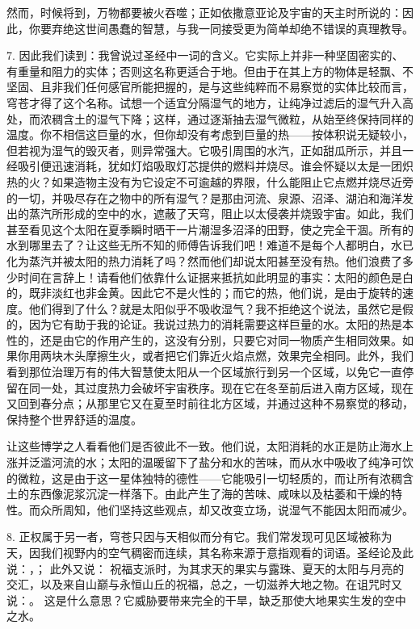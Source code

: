 然而，时候将到，万物都要被火吞噬；正如依撒意亚论及宇宙的天主时所说的：因此，你要弃绝这世间愚蠢的智慧，与我一同接受更为简单却绝不错误的真理教导。\par

7. 因此我们读到：我曾说过圣经中一词的含义。它实际上并非一种坚固密实的、有重量和阻力的实体；否则这名称更适合于地。但由于在其上方的物体是轻飘、不坚固、且非我们任何感官所能把握的，是与这些纯粹而不易察觉的实体比较而言，穹苍才得了这个名称。试想一个适宜分隔湿气的地方，让纯净过滤后的湿气升入高处，而浓稠含土的湿气下降；这样，通过逐渐抽去湿气微粒，从始至终保持同样的温度。你不相信这巨量的水，但你却没有考虑到巨量的热——按体积说无疑较小，但若视为湿气的毁灭者，则异常强大。它吸引周围的水汽，正如甜瓜所示，并且一经吸引便迅速消耗，犹如灯焰吸取灯芯提供的燃料并烧尽。谁会怀疑以太是一团炽热的火？如果造物主没有为它设定不可逾越的界限，什么能阻止它点燃并烧尽近旁的一切，并吸尽存在之物中的所有湿气？是那由河流、泉源、沼泽、湖泊和海洋发出的蒸汽所形成的空中的水，遮蔽了天穹，阻止以太侵袭并烧毁宇宙。如此，我们甚至看见这个太阳在夏季瞬时晒干一片潮湿多沼泽的田野，使之完全干涸。所有的水到哪里去了？让这些无所不知的师傅告诉我们吧！难道不是每个人都明白，水已化为蒸汽并被太阳的热力消耗了吗？然而他们却说太阳甚至没有热。他们浪费了多少时间在言辞上！请看他们依靠什么证据来抵抗如此明显的事实：太阳的颜色是白的，既非淡红也非金黄。因此它不是火性的；而它的热，他们说，是由于旋转的速度。他们得到了什么？就是太阳似乎不吸收湿气？我不拒绝这个说法，虽然它是假的，因为它有助于我的论证。我说过热力的消耗需要这样巨量的水。太阳的热是本性的，还是由它的作用产生的，这没有分别，只要它对同一物质产生相同效果。如果你用两块木头摩擦生火，或者把它们靠近火焰点燃，效果完全相同。此外，我们看到那位治理万有的伟大智慧使太阳从一个区域旅行到另一个区域，以免它一直停留在同一处，其过度热力会破坏宇宙秩序。现在它在冬至前后进入南方区域，现在又回到春分点；从那里它又在夏至时前往北方区域，并通过这种不易察觉的移动，保持整个世界舒适的温度。\par

让这些博学之人看看他们是否彼此不一致。他们说，太阳消耗的水正是防止海水上涨并泛滥河流的水；太阳的温暖留下了盐分和水的苦味，而从水中吸收了纯净可饮的微粒，这是由于这一星体独特的德性——它能吸引一切轻质的，而让所有浓稠含土的东西像泥浆沉淀一样落下。由此产生了海的苦味、咸味以及枯萎和干燥的特性。而众所周知，他们坚持这些观点，却又改变立场，说湿气不能因太阳而减少。\par

8.   正权属于另一者，穹苍只因与天相似而分有它。我们常发现可见区域被称为天，因我们视野内的空气稠密而连续，其名称来源于意指观看的词语。圣经论及此说：，； 此外又说： 祝福支派时，为其求天的果实与露珠、夏天的太阳与月亮的交汇，以及来自山巅与永恒山丘的祝福，总之，一切滋养大地之物。在诅咒时又说：。 这是什么意思？它威胁要带来完全的干旱，缺乏那使大地果实生发的空中之水。\par

